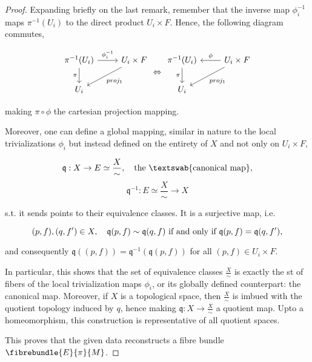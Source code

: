 \begin{proof}
    Expanding briefly on the last remark, remember that the inverse map $\phi_i^{-1}$ maps $\pi^{-1}(U_i)$ to the direct product $U_i \times F$. Hence, the following diagram commutes,

    \[
    \begin{tikzcd}
          \pi^{-1}(U_i) \arrow[d, "\pi"'] \arrow[r, "\phi_i^{-1}"] & U_i \times F \arrow[ld, "proj_1"] \\
                    U_i                                                 &            
        \end{tikzcd} \Leftrightarrow
    \begin{tikzcd}
	{\pi^{-1}(U_i)} & {U_i \times F} \\
	{U_i}
	\arrow["\phi"', from=1-2, to=1-1]
	\arrow["\pi"', from=1-1, to=2-1]
	\arrow["{proj_1}", from=1-2, to=2-1]
    \end{tikzcd}
    \]

    making $\pi \circ \phi$ the cartesian projection mapping. \medbreak
    
    Moreover, one can define a global mapping, similar in nature to the local trivializations $\phi_i$ but instead defined on the entirety of $X$ and not only on $U_i \times F$,
    
    $$
        \mathfrak{q} : X \rightarrow E \simeq \frac{X}{\sim}, \quad \textnormal{the \textswab{canonical map}},
    $$ 
    $$
        \mathfrak{q}^{-1}: E \simeq \frac{X}{\sim} \rightarrow X
    $$
    
    
    s.t. it sends points to their equivalence classes.
    It is a surjective map, i.e. 
    
    \[
        (p,f), (q,f') \in X, \quad \mathfrak{q} (p,f) \sim \mathfrak{q} (q,f)  \textnormal{ if and only if } \mathfrak{q}(p,f) = \mathfrak{q}(q,f'),
    \]

    and consequently $\mathfrak{q}((p,f)) = \mathfrak{q}^{-1}(\mathfrak{q}(p,f))$ for all $(p,f) \in U_i \times F$. \medbreak

    In particular, this shows that the set of equivalence classes $\frac{X}{\sim}$ is exactly the st of fibers of the local trivialization maps $\phi_i$, or its globally defined counterpart: the canonical map. 
    Moreover, if $X$ is a topological space, then $\frac{X}{\sim}$ is imbued with the quotient topology induced by $q$, hence making $\mathfrak{q}:X \rightarrow \frac{X}{\sim}$ a quotient map.
    Upto a homeomorphism, this construction is representative of all quotient spaces. \medbreak
    
    This proves that the given data reconstructs a fibre bundle $\fibrebundle{E}{\pi}{M}$.
\end{proof}

